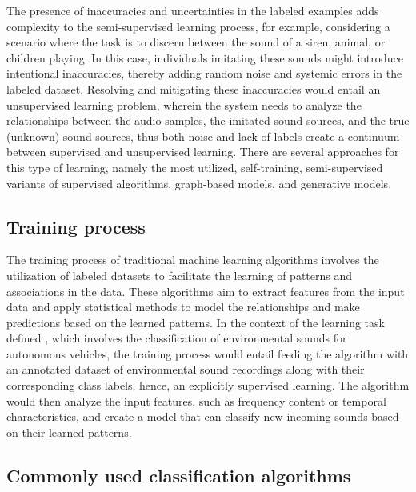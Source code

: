 The presence of inaccuracies and uncertainties in the labeled examples adds complexity to the semi-supervised learning process, for example, considering a scenario where the task is to discern between the sound of a siren, animal, or children playing. In this case, individuals imitating these sounds might introduce intentional inaccuracies, thereby adding random noise and systemic errors in the labeled dataset. Resolving and mitigating these inaccuracies would entail an unsupervised learning problem, wherein the system needs to analyze the relationships between the audio samples, the imitated sound sources, and the true (unknown) sound sources, thus both noise and lack of labels create a continuum between supervised and unsupervised learning. There are several approaches for this type of learning, namely the most utilized, self-training, semi-supervised variants of supervised algorithms, graph-based models, and generative models.


\subsection{Training process}
\label{subsec:machine_learning_training}

The training process of traditional machine learning algorithms involves the utilization of labeled datasets to facilitate the learning of patterns and associations in the data. These algorithms aim to extract features from the input data and apply statistical methods to model the relationships and make predictions based on the learned patterns. In the context of the learning task defined \cite{Mitchell1997}, which involves the classification of environmental sounds for autonomous vehicles, the training process would entail feeding the algorithm with an annotated dataset of environmental sound recordings along with their corresponding class labels, hence, an explicitly supervised learning. The algorithm would then analyze the input features, such as frequency content or temporal characteristics, and create a model that can classify new incoming sounds based on their learned patterns.


\subsection{Commonly used classification algorithms}
\label{subsec:machine_learning_common_classification}

